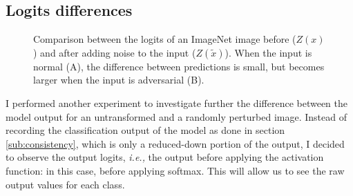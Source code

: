 \subsection{Logits differences}
\label{sub:logits_differences}
\begin{figure}[ht]
    \centering

     \caption{Comparison between the logits of an ImageNet image before
        ($Z(x)$) and after adding noise to the input ($Z(\tilde{x})$). When the
        input is normal (A), the difference between predictions is small, but
        becomes larger when the input is adversarial (B).}
    \label{fig:logits}
\end{figure}

I performed another experiment to investigate further the difference between the
model output for an untransformed and a randomly perturbed image. Instead of
recording the classification output of the model as done in section
\ref{sub:consistency}, which is only a reduced-down portion of the output, I
decided to observe the output logits, \emph{i.e.,} the output before applying
the activation function: in this case, before applying softmax. This will allow
us to see the raw output values for each class.


